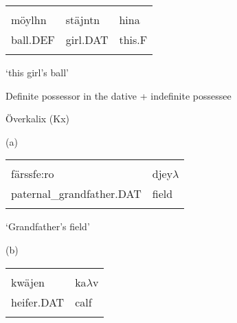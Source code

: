 \begin{tabular}{lll}
\lsptoprule
\multicolumn{3}{l}{{\bfseries\scshape possessee}

}\\
möylhn & stäjntn & hina\\
ball.DEF & girl.DAT & this.F\\
\lspbottomrule
\end{tabular}

\begin{styleTranslation}
‘this girl’s ball’

\end{styleTranslation}


\begin{listWWNumxiileveli}
\item {}

\begin{styleListii}
Definite possessor in the dative + indefinite possessee

\end{styleListii}

\end{listWWNumxiileveli}

\begin{listWWNumileveli}
\item {}

\begin{styleExample}
Överkalix (Kx)

\end{styleExample}

\end{listWWNumileveli}

(a)

\begin{tabular}{ll}
\lsptoprule
\multicolumn{2}{l}{{\bfseries\scshape possessor}

}\\
färssfe:ro & djey$\lambda $\\
paternal\_grandfather.DAT & field\\
\lspbottomrule
\end{tabular}

\begin{styleTranslation}
‘Grandfather’s field’

\end{styleTranslation}

(b)

\begin{tabular}{ll}
\lsptoprule
\multicolumn{2}{l}{{\bfseries\scshape possessor}

}\\
kwäjen & ka$\lambda $v\\
heifer.DAT & calf\\
\lspbottomrule
\end{tabular}

